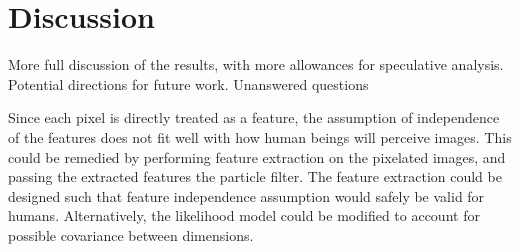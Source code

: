 \section*{Discussion}

More full discussion of the results, with more allowances for speculative
analysis.  Potential directions for future work.  Unanswered questions

Since each pixel is directly treated as a feature, the assumption of
independence of the features does not fit well with how human beings will
perceive images.  This could be remedied by performing feature extraction on the
pixelated images, and passing the extracted features the particle filter.  The
feature extraction could be designed such that feature independence assumption
would safely be valid for humans. Alternatively, the likelihood model could be
modified to account for possible covariance between dimensions.